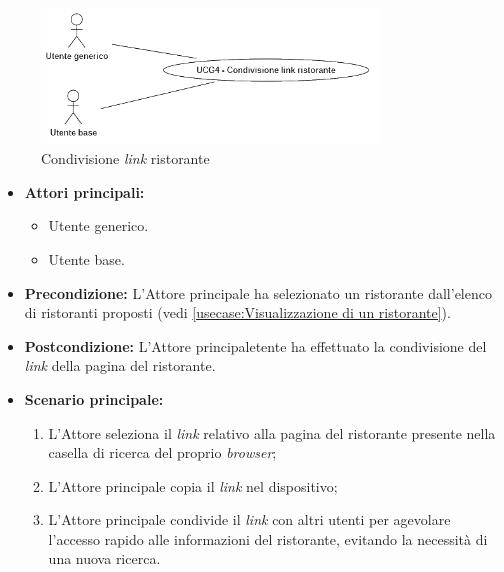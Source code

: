 \newpage
{}
\label{usecase:Condivisione link del ristorante}

\begin{figure}[h]
	\centering
	\includegraphics[width=0.8\textwidth]{./uml/UCG4.png} 
	\caption{Condivisione \textit{link} ristorante}
	\label{fig:UCG4}
  \end{figure}

\begin{itemize}
	\item \textbf{Attori principali:} 
	\begin{itemize}
		\item Utente generico.
		\item Utente base.
	\end{itemize}


	\item \textbf{Precondizione:}
	      L'Attore principale ha selezionato un ristorante dall'elenco di ristoranti
	      proposti (vedi \autoref{usecase:Visualizzazione di un ristorante}).

	\item \textbf{Postcondizione:}
	      L'Attore principaletente ha effettuato la condivisione del \textit{link} della pagina del ristorante.

	\item \textbf{Scenario principale:}
	      \begin{enumerate}
		      \item L'Attore seleziona il \textit{link} relativo alla pagina del ristorante presente nella casella di ricerca del proprio \textit{browser};
		      \item L'Attore principale copia il \textit{link} nel dispositivo;
		      \item L'Attore principale condivide il \textit{link} con altri utenti per agevolare l'accesso rapido alle
		            informazioni del ristorante, evitando la necessità di una nuova ricerca.
	      \end{enumerate}
\end{itemize}
